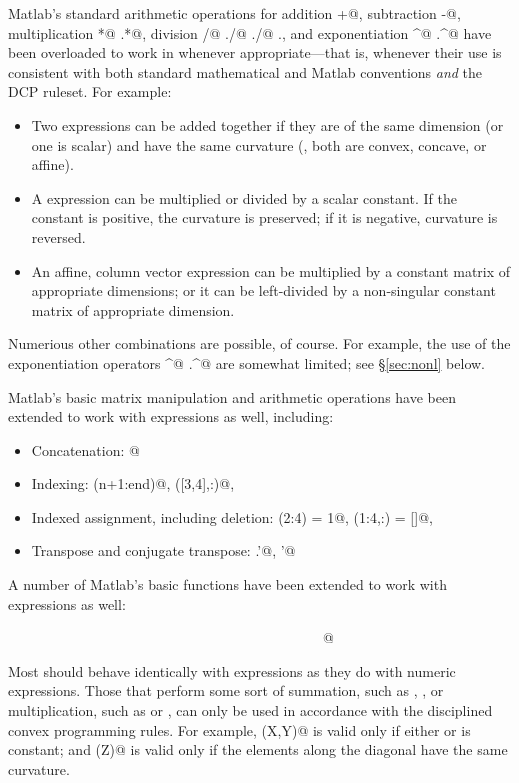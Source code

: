 \documentclass[12pt]{article}
\begin{document}
Matlab's standard arithmetic operations for
addition \verb@+@, subtraction \verb@-@, multiplication
\verb@*@ \verb@.*@, division \verb@/@ \verb@\@ \verb@./@
\verb@./@ \verb@.\@, and exponentiation \verb@^@ \verb@.^@
have been overloaded to work in \cvx whenever appropriate---that
is, whenever their use is consistent with both standard mathematical
and Matlab conventions \emph{and} the DCP ruleset.
For example:
\begin{itemize}
\item Two \cvx expressions can be added together if they are of the same
      dimension (or one is scalar) and have the same curvature (\ie, 
      both are convex, concave, or affine).
\item A \cvx expression can be multiplied or divided by a scalar constant. If the
      constant is positive, the curvature is preserved; if it is negative,
      curvature is reversed.      
\item An affine, column vector \cvx expression can be multiplied by a constant matrix
      of appropriate dimensions; or it can be left-divided by a non-singular 
      constant matrix of appropriate dimension.
\end{itemize}
Numerious other combinations are possible, of course.
For example, the use of the exponentiation operators \verb@^@
\verb@.^@ are somewhat limited; see \S\ref{sec:nonl} below.

Matlab's basic matrix manipulation and arithmetic
operations have been extended to work with
\cvx expressions as well, including:
\begin{itemize}
\item Concatenation: \verb@[ A, B ; C, D ]@
\item Indexing: \verb@x(n+1:end)@, \verb@X([3,4],:)@, \etc
\item Indexed assignment, including deletion: \verb@y(2:4) = 1@, \verb@Z(1:4,:) = []@, \etc
\item Transpose and conjugate transpose: \verb@Z.'@, \verb@y'@
\end{itemize}
A number of Matlab's basic functions have been extended to work with \verb@cvx@
expressions as well:
\begin{center}
\verb@conj@\ \ \ \verb@cumsum@\ \ \ \verb@diag@\ \ \ \verb@dot@\ \ \ 
\verb@find@\ \ \ \verb@fliplr@\ \ \ \verb@flipud@\ \ \ \verb@flipdim@\ \ \
\verb@horzcat@\ \ \ \verb@hankel@\ \ \ \verb@ipermute@\ \ \ \verb@kron@\ \ \
\verb@permute@\ \ \ \verb@repmat@\ \ \ \verb@reshape@\ \ \ @\ \ \
\verb@sparse@\ \ \ \verb@sum@\ \ \ \verb@trace@\ \ \ \verb@tril@\ \ \
\verb@triu@\ \ \ \verb@toeplitz@\ \ \ \verb@vertcat@
\end{center}
Most should behave identically with \cvx expressions as they do with numeric expressions.
Those that perform some sort of summation, such as \verb@cumsum@, \verb@sum@, or
multiplication, such as \verb@dot@ or \verb@kron@, can
only be used in accordance with the disciplined convex programming rules. For example,
\verb@kron(X,Y)@ is valid only if either \verb@X@ or \verb@Y@ is constant; and 
\verb@trace(Z)@ is valid only if the elements along the diagonal have the same curvature.
\end{document}
